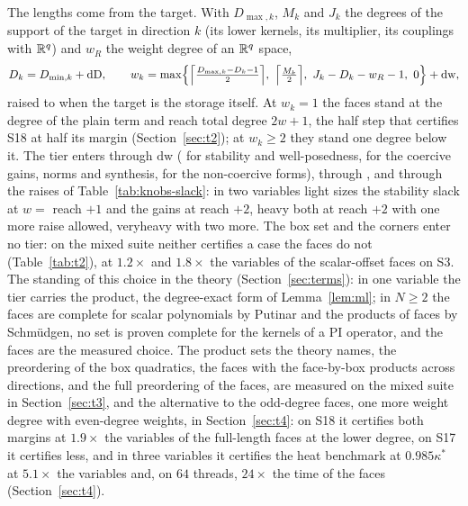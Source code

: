 The lengths come from the target. With $D_{\max,k}$, $M_k$ and $J_k$ the degrees of the support of the target in direction $k$ (its lower kernels, its multiplier, its couplings with $\mathbb{R}^q$) and $w_R$ the weight degree of an $\mathbb{R}^q$ space,
\[
D_k=D_{\min,k}+\mathrm{dD},\qquad w_k=\max\Bigl\{\Bigl\lceil\tfrac{D_{\max,k}-D_k-1}{2}\Bigr\rceil,\ \Bigl\lceil\tfrac{M_k}{2}\Bigr\rceil,\ J_k-D_k-w_R-1,\ 0\Bigr\}+\mathrm{dw},
\]
raised to  when the target is the storage itself. At $w_k=1$ the faces stand at the degree of the plain term and reach total degree $2w+1$, the half step that certifies S18 at half its margin (Section~\ref{sec:t2}); at $w_k\ge2$ they stand one degree below it. The tier enters through $\mathrm{dw}$ ( for stability and well-posedness,  for the coercive gains, norms and synthesis,  for the non-coercive forms), through , and through the raises of Table~\ref{tab:knobs-slack}: in two variables light sizes the stability slack at $w=$ reach $+1$ and the gains at reach $+2$, heavy both at reach $+2$ with one more raise allowed, veryheavy with two more. The box set and the corners enter no tier: on the mixed suite neither certifies a case the faces do not (Table~\ref{tab:t2}), at $1.2\times$ and $1.8\times$ the variables of the scalar-offset faces on S3. The standing of this choice in the theory (Section~\ref{sec:terms}): in one variable the tier carries the product, the degree-exact form of Lemma~\ref{lem:ml}; in $N\ge2$ the faces are complete for scalar polynomials by Putinar and the products of faces by Schm\"udgen, no set is proven complete for the kernels of a PI operator, and the faces are the measured choice. The product sets the theory names, the preordering of the box quadratics, the faces with the face-by-box products across directions, and the full preordering of the faces, are measured on the mixed suite in Section~\ref{sec:t3}, and the alternative to the odd-degree faces, one more weight degree with even-degree weights, in Section~\ref{sec:t4}: on S18 it certifies both margins at $1.9\times$ the variables of the full-length faces at the lower degree, on S17 it certifies less, and in three variables it certifies the heat benchmark at $0.985\kappa^*$ at $5.1\times$ the variables and, on $64$ threads, $24\times$ the time of the faces (Section~\ref{sec:t4}).
